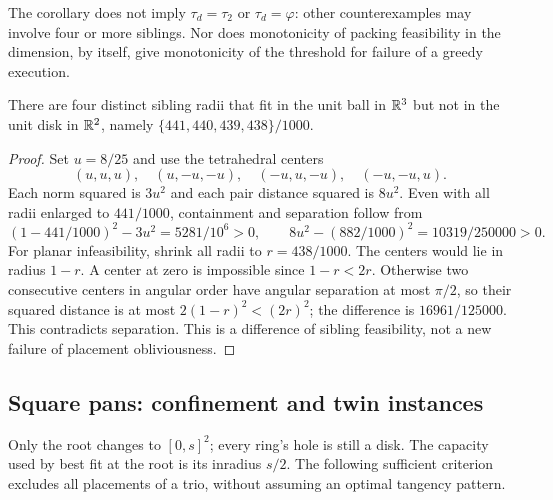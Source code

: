 The corollary does not imply $\tau_d=\tau_2$ or $\tau_d=\varphi$:
other counterexamples may involve four or more siblings. Nor does
monotonicity of packing feasibility in the dimension, by itself,
give monotonicity of the threshold for failure of a greedy execution.

\begin{proposition}\label{prop:dimfour}
There are four distinct sibling radii that fit in the unit ball
in $\mathbb{R}^3$ but not in the unit disk in $\mathbb{R}^2$, namely
$\{441,440,439,438\}/1000$.
\end{proposition}
\begin{proof}
Set $u=8/25$ and use the tetrahedral centers
\[
(u,u,u),\quad(u,-u,-u),\quad(-u,u,-u),\quad(-u,-u,u).
\]
Each norm squared is
$3u^2$ and each pair distance squared is $8u^2$. Even with all
radii enlarged to $441/1000$, containment and separation follow from
\[
 (1-441/1000)^2-3u^2=5281/10^6>0,\qquad
 8u^2-(882/1000)^2=10319/250000>0.
\]
For planar infeasibility, shrink all radii to $r=438/1000$.
The centers would lie in radius $1-r$. A center at zero is impossible
since $1-r<2r$. Otherwise two consecutive centers in angular order
have angular separation at most $\pi/2$, so their squared distance
is at most $2(1-r)^2<(2r)^2$; the difference is $16961/125000$.
This contradicts separation. This is a difference of sibling
feasibility, not a new failure of placement obliviousness.
\end{proof}

\subsection{Square pans: confinement and twin instances}\label{sec:square}

Only the root changes to $[0,s]^2$; every ring's hole is still a disk.
The capacity used by best fit at the root is its inradius $s/2$.
The following sufficient criterion excludes all placements of a trio,
without assuming an optimal tangency pattern.


